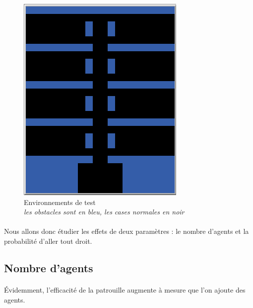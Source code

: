 \documentclass{article}
\begin{document}
\begin{figure}[!h]
\begin{center}
                \includegraphics[width = \textwidth/5]{corridor_png.PNG}
                \caption{Environnements de test \\ \textit{les obstacles sont en bleu, les cases normales en noir}}
            \end{center}
        \end{figure}

        \paragraph{} Nous allons donc étudier les effets de deux paramètres : le nombre d'agents et la probabilité d'aller tout droit.
    \subsection{Nombre d'agents}
        \paragraph{}Évidemment, l'efficacité de la patrouille augmente à mesure que l'on ajoute des agents.
\end{document}
